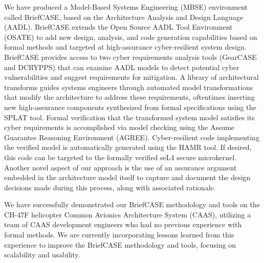 We have produced a Model-Based Systems Engineering (MBSE) environment
called BriefCASE, based on the Architecture Analysis and Design
Language (AADL). BriefCASE extends the Open Source AADL
Tool Environment (OSATE) to add new design, analysis, and code
generation capabilities based on formal methods and targeted at
high-assurance cyber-resilient system design. BriefCASE provides
access to two cyber requirements analysis tools (GearCASE
and DCRYPPS) that can examine AADL models to detect potential
cyber vulnerabilities and suggest requirements for mitigation.
A library of architectural transforms guides systems engineers
through automated model transformations that modify the
architecture to address these requirements, oftentimes inserting new
high-assurance components synthesized from formal
specifications using the SPLAT tool. Formal verification that the
transformed system model satisfies its cyber requirements is accomplished
via model checking using the Assume Guarantee Reasoning
Environment (AGREE). Cyber-resilient code implementing the
verified model is automatically generated using the HAMR
tool. If desired, this code can be targeted to the formally
verified seL4 secure microkernel.  Another novel aspect of our approach is
the use of an assurance argument embedded in the architecture model
itself to capture and document the design decisions made during this
process, along with associated rationale.

We have successfully demonstrated our BriefCASE methodology and tools on the
CH-47F helicopter Common Avionics Architecture System (CAAS), utilizing a team of CAAS
development engineers who had no previous experience with formal methods.  We
are currently incorporating lessons learned from this experience to improve the BriefCASE
methodology and tools, focusing on scalability and usability.


